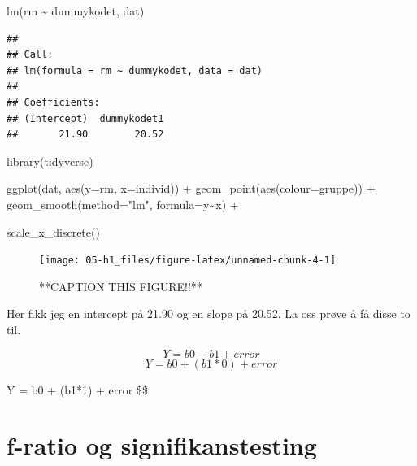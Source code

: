\documentclass[
]{book}
\newenvironment{Shaded}{\begin{snugshade}}{\end{snugshade}}
\newcommand{\AttributeTok}[1]{\textcolor[rgb]{0.77,0.63,0.00}{#1}}
\newcommand{\FunctionTok}[1]{\textcolor[rgb]{0.00,0.00,0.00}{#1}}
\newcommand{\NormalTok}[1]{#1}
\newcommand{\SpecialCharTok}[1]{\textcolor[rgb]{0.00,0.00,0.00}{#1}}
\newcommand{\StringTok}[1]{\textcolor[rgb]{0.31,0.60,0.02}{#1}}
\begin{document}
\begin{Shaded}
\begin{Highlighting}[]
\FunctionTok{lm}\NormalTok{(rm }\SpecialCharTok{\textasciitilde{}}\NormalTok{ dummykodet, dat)}
\end{Highlighting}
\end{Shaded}

\begin{verbatim}
## 
## Call:
## lm(formula = rm ~ dummykodet, data = dat)
## 
## Coefficients:
## (Intercept)  dummykodet1  
##       21.90        20.52
\end{verbatim}

\begin{Shaded}
\begin{Highlighting}[]
\FunctionTok{library}\NormalTok{(tidyverse)}



\FunctionTok{ggplot}\NormalTok{(dat, }\FunctionTok{aes}\NormalTok{(}\AttributeTok{y=}\NormalTok{rm, }\AttributeTok{x=}\NormalTok{individ)) }\SpecialCharTok{+} 
  \FunctionTok{geom\_point}\NormalTok{(}\FunctionTok{aes}\NormalTok{(}\AttributeTok{colour=}\NormalTok{gruppe)) }\SpecialCharTok{+}
  \FunctionTok{geom\_smooth}\NormalTok{(}\AttributeTok{method=}\StringTok{"lm"}\NormalTok{, }\AttributeTok{formula=}\NormalTok{y}\SpecialCharTok{\textasciitilde{}}\NormalTok{x) }\SpecialCharTok{+}
  
  \FunctionTok{scale\_x\_discrete}\NormalTok{()}
\end{Highlighting}
\end{Shaded}

\begin{figure}

{\centering \texttt{[image: 05-h1\_files/figure-latex/unnamed-chunk-4-1]} 

}

\caption{**CAPTION THIS FIGURE!!**}\label{fig:unnamed-chunk-4}
\end{figure}

Her fikk jeg en intercept på 21.90 og en slope på 20.52. La oss prøve å få disse to til.

\[
Y = b0 + b1 + error
\]
\[
Y = b0 + (b1*0) + error
\]

\[
\]
Y = b0 + (b1*1) + error
\$\$

\hypertarget{f-ratio-og-signifikanstesting}{%
\chapter{f-ratio og signifikanstesting}\label{f-ratio-og-signifikanstesting}}
\end{document}

